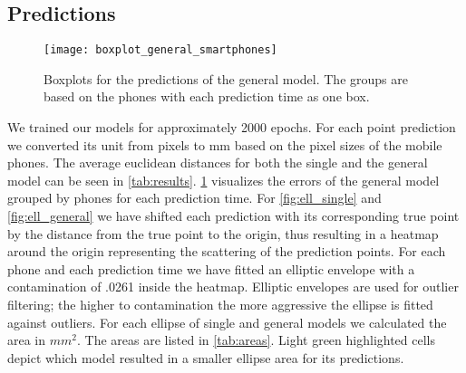 \subsection{Predictions}
\begin{figure}[t]
	\texttt{[image: boxplot\_general\_smartphones]}
	\caption{Boxplots for the predictions of the general model. The groups are based on the phones with each prediction time as one box.}
	\label{fig:boxplots_general}
\end{figure}
We trained our models for approximately 2000 epochs.
For each point prediction we converted its unit from pixels to mm based on the pixel sizes of the mobile phones.
The average euclidean distances for both the single and the general model can be seen in \cref{tab:results}.
\cref{fig:boxplots_general} visualizes the errors of the general model grouped by phones for each prediction time.
For \cref{fig:ell_single} and \cref{fig:ell_general} we have shifted each prediction with its corresponding true point by the distance from the true point to the origin, thus resulting in a heatmap around the origin representing the scattering of the prediction points.
For each phone and each prediction time we have fitted an elliptic envelope with a contamination of .0261 inside the heatmap.
Elliptic envelopes are used for outlier filtering; the higher to contamination the more aggressive the ellipse is fitted against outliers.
For each ellipse of single and general models we calculated the area in $ mm^{2}$.
The areas are listed in \cref{tab:areas}.
Light green highlighted cells depict which model resulted in a smaller ellipse area for its predictions.

